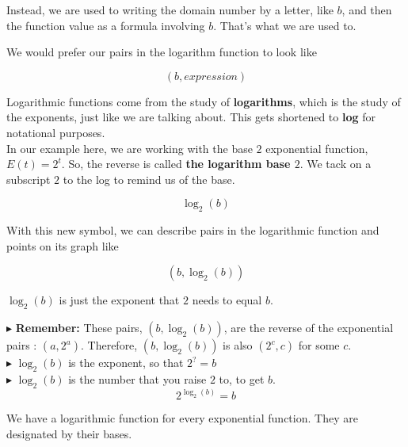 \documentclass{ximera}
\begin{document}
Instead, we are used to writing the domain number by a letter, like $b$, and then the function value as a formula involving $b$. That's what we are used to.

We would prefer our pairs in the logarithm function to look like 

\[ (b, expression)  \]







Logarithmic functions come from the study of \textbf{logarithms}, which is the study of the exponents, just like we are talking about. This gets shortened to \textbf{log} for notational purposes.  \\



In our example here, we are working with the base $2$ exponential function, $E(t) = 2^t$. So, the reverse is called \textbf{the logarithm base $2$}.  We tack on a subscript $2$ to the log to remind us of the base.



\[   \log_2(b)     \]


With this new symbol, we can describe pairs in the logarithmic function and points on its graph like 


\[
(b, \log_2(b))
\]


$\log_2(b)$ is just the exponent that $2$ needs to equal $b$.





$\blacktriangleright$ \textbf{Remember:} These pairs, $(b, \log_2(b))$, are the reverse of the exponential pairs : $(a, 2^a)$.  Therefore, $(b, \log_2(b))$ is also $(2^c, c)$ for some $c$. \\

$\blacktriangleright$  $\log_2(b)$ is the exponent, so that $2^? = b$ \\


$\blacktriangleright$  $\log_2(b)$ is the number that you raise $2$ to, to get $b$.  \\

\[   2^{\log_2(b)} = b     \]

We have a logarithmic function for every exponential function.  They are designated by their bases.
\end{document}
